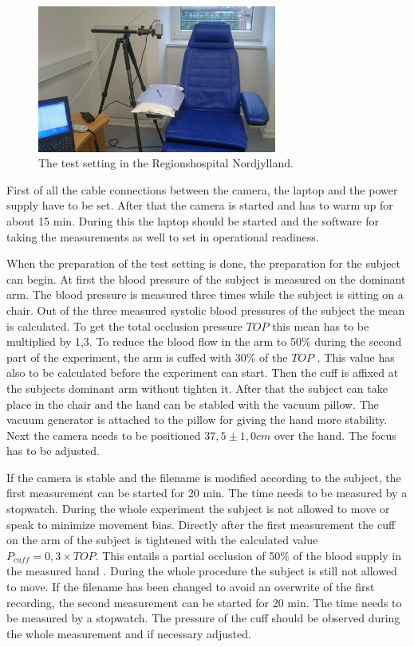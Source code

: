 \begin{figure}[H]
	\includegraphics[width=0.7\textwidth]{figures/setting}
	\caption{The test setting in the Regionshospital Nordjylland.}
	\label{fig:FigureLABEL}
\end{figure}

First of all the cable connections between the camera, the laptop and the power supply have to be set. After that the camera is started and has to warm up for about 15 min. During this the laptop should be started and the software for taking the measurements as well to set in operational readiness.

When the preparation of the test setting is done, the preparation for the subject can begin. At first the blood pressure of the subject is measured on the dominant arm. The blood pressure is measured three times while the subject is sitting on a chair. Out of the three measured systolic blood pressures of the subject the mean is calculated. To get the total occlusion pressure $TOP$ this mean has to be multiplied by 1,3. To reduce the blood flow in the arm to 50\% during the second part of the experiment, the arm is cuffed with 30\% of the $TOP$ \cite{mouser2017}. This value has also to be calculated before the experiment can start.
Then the cuff is affixed at the subjects dominant arm without tighten it. After that the subject can take place in the chair and the hand can be stabled with the vacuum pillow. The vacuum generator is attached to the pillow for giving the hand more stability. Next the camera needs to be positioned $37,5\pm 1,0 cm$ over the hand. The focus has to be adjusted. 

If the camera is stable and the filename is modified according to the subject, the first measurement can be started for 20 min. The time needs to be measured by a stopwatch. During the whole experiment the subject is not allowed to move or speak to minimize movement bias.
Directly after the first measurement the cuff on the arm of the subject is tightened with the calculated value $P_{cuff}=0,3\times TOP$. This entails a partial occlusion of 50\% of the blood supply in the measured hand \cite{mouser2017}. During the whole procedure the subject is still not allowed to move. If the filename has been changed to avoid an overwrite of the first recording, the second measurement can be started for 20 min. The time needs to be measured by a stopwatch. The pressure of the cuff should be observed during the whole measurement and if necessary adjusted.

